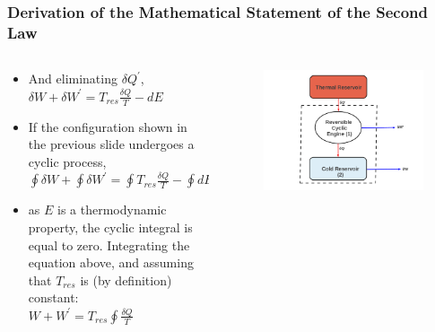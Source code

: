 \documentclass[10pt,compress,handout,ignorenonframetext]{beamer}
\begin{document}
\begin{frame}
 \frametitle{Derivation of the Mathematical Statement of the Second Law}
 \begin{columns}

  \begin{column}[c]{0.55\linewidth}
   \begin{itemize}
    \item <1-> And eliminating $\delta Q^{\prime}$, \\
                $\delta W + \delta W^{\prime} = T_{res}\displaystyle\frac{\delta Q}{T} - dE$
     \item <2-> If the configuration shown in the previous slide undergoes a cyclic process, \\
             $\displaystyle\oint \delta W + \displaystyle\oint \delta W^{\prime} = \displaystyle\oint T_{res}\displaystyle\frac{\delta Q}{T} - \displaystyle\oint dE$
     \item <3-> as $E$ is a thermodynamic property, the cyclic integral is equal to zero.  Integrating the equation above, and assuming that $T_{res}$ is (by definition) constant:\\
             $W + W^{\prime} = T_{res} \displaystyle\oint \displaystyle\frac{\delta Q}{T}$
   \end{itemize}
  \end{column}

  \begin{column}[c]{0.45\linewidth}
   \begin{figure}%
    \begin{center}
     \includegraphics[width=1.\columnwidth,clip]{./Pics/2ndLaw_Schem2}
    \end{center}
   \end{figure} 
  \end{column}
 \end{columns}
 \normalsize
    
\end{frame}
\end{document}
